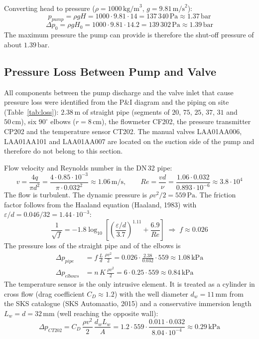 \documentclass[12pt,a4paper]{article}
\begin{document}
Converting head to pressure ($\rho = 1000\,\text{kg/m}^3$, $g = 9.81\,\text{m/s}^2$):
\begin{equation}
    p_{pump} = \rho g H = 1000 \cdot 9.81 \cdot 14 = 137\,340\,\text{Pa} \approx 1.37\,\text{bar}
\end{equation}
\begin{equation}
    \Delta p_0 = \rho g H_0 = 1000 \cdot 9.81 \cdot 14.2 = 139\,302\,\text{Pa} \approx 1.39\,\text{bar}
\end{equation}
The maximum pressure the pump can provide is therefore the shut-off pressure of about $1.39\,\text{bar}$.

\subsection{Pressure Loss Between Pump and Valve}
All components between the pump discharge and the valve inlet that cause pressure loss were identified from the P\&I diagram and the piping on site (Table~\ref{tab:loss}): $2.38\,\text{m}$ of straight pipe (segments of $20$, $75$, $25$, $37$, $31$ and $50\,\text{cm}$), six $90^\circ$ elbows ($r = 8\,\text{cm}$), the flowmeter CF202, the pressure transmitter CP202 and the temperature sensor CT202. The manual valves LAA01AA006, LAA01AA101 and LAA01AA007 are located on the suction side of the pump and therefore do not belong to this section.

Flow velocity and Reynolds number in the DN\,32 pipe:
\begin{equation}
    v = \frac{4q}{\pi d^2} = \frac{4 \cdot 0.85\cdot 10^{-3}}{\pi \cdot 0.032^2} \approx 1.06\,\text{m/s}, \qquad
    Re = \frac{v d}{\nu} = \frac{1.06 \cdot 0.032}{0.893\cdot 10^{-6}} \approx 3.8\cdot 10^{4}
\end{equation}
The flow is turbulent. The dynamic pressure is $\rho v^2/2 = 559\,\text{Pa}$. The friction factor follows from the Haaland equation (Haaland, 1983) with $\varepsilon/d = 0.046/32 = 1.44\cdot 10^{-3}$:
\begin{equation}
    \frac{1}{\sqrt{f}} = -1.8 \log_{10}\!\left[\left(\frac{\varepsilon/d}{3.7}\right)^{1.11} + \frac{6.9}{Re}\right] \;\Rightarrow\; f \approx 0.026
\end{equation}
The pressure loss of the straight pipe and of the elbows is
\begin{align}
    \Delta p_{pipe} &= f\,\frac{L}{d}\,\frac{\rho v^2}{2} = 0.026 \cdot \frac{2.38}{0.032} \cdot 559 \approx 1.08\,\text{kPa} \\
    \Delta p_{elbows} &= n\,K\,\frac{\rho v^2}{2} = 6 \cdot 0.25 \cdot 559 \approx 0.84\,\text{kPa}
\end{align}
The temperature sensor is the only intrusive element. It is treated as a cylinder in cross flow (drag coefficient $C_D \approx 1.2$) with the well diameter $d_w = 11\,\text{mm}$ from the SKS catalogue (SKS Automaatio, 2015) and a conservative immersion length $L_w = d = 32\,\text{mm}$ (well reaching the opposite wall):
\begin{equation}
    \Delta p_{CT202} = C_D\,\frac{\rho v^2}{2}\,\frac{d_w L_w}{A} = 1.2 \cdot 559 \cdot \frac{0.011 \cdot 0.032}{8.04\cdot 10^{-4}} \approx 0.29\,\text{kPa}
\end{equation}
\end{document}
